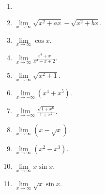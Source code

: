 \begin{multicols}{3}
\begin{enumerate}[ref={\fcProblemRef}]
\item 
\item $\displaystyle \lim\limits_{x\to \infty}\sqrt{ x^2+ax}- \sqrt{x^2+bx}$.

\item $\displaystyle \lim\limits_{x\to\infty}\cos x$.

\item $\displaystyle \lim\limits_{x\to\infty}\frac{x^4+x}{x^3-x+2}$.

\answer{$\infty$}
\item $\displaystyle \lim\limits_{x\to\infty}\sqrt{x^2+1}$.

\answer{$\infty$}
\item $\displaystyle \lim\limits_{x\to-\infty}(x^4+x^5)$.

\answer{$-\infty$}
\item $\displaystyle \lim\limits_{x\to-\infty}\frac{\sqrt{1+x^6}}{1+x^2}$.

\answer{$\infty$}
\item $\displaystyle \lim\limits_{x\to\infty}(x-\sqrt{x})$.

\answer{$\infty$}
\item $\displaystyle \lim\limits_{x\to\infty}(x^2-x^3)$.

\answer{$-\infty$}
\item $\displaystyle \lim\limits_{x\to\infty}x\sin x$.

\item $\displaystyle \lim\limits_{x\to\infty}\sqrt{x}\sin x$.

\end{enumerate}
\end{multicols}